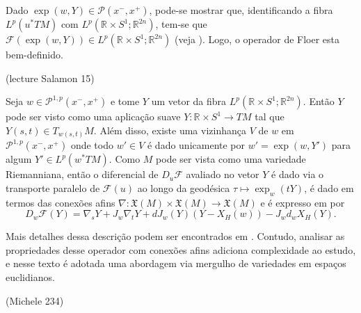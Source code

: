 \documentclass[12pt]{book}
\newcommand{\caminhosexponenciaisconectantesabrev}{\mathcal{P}(x^{-},x^{+})}
\newcommand{\caminhosexponenciaisconectantes}[2]{\mathcal{P}^{1,p}(#1, #2)}
\newcommand{\caminhosexponenciaisconectantespadrao}{\caminhosexponenciaisconectantes{x^{-}}{x^{+}}}
\newcommand{\campossuaves}[1]{\mathfrak{X}(#1)}
\newcommand{\circulo}{S^{1}}
\newcommand{\diferencialfloerponto}[1]{D_{#1}\operadorFloer}
\newcommand{\espacoLp}[1]{L^{p}(#1)}
\newcommand{\espacotangenteponto}[2]{T_{#1}#2}
\newcommand{\operadorFloer}{\mathcal{F}}
\newcommand{\operadorFloerParametro}[1]{\mathcal{F}(#1)}
\newcommand{\pullbackfibradotangente}[2]{#1^{*}T#2}
\newcommand{\pullbackfibradotangenteM}[1]{\pullbackfibradotangente{#1}{M}}
\newcommand{\retacartesianocirculo}{\real{} \times \circulo}
\newcommand{\real}[1]{\mathbb{R}^{#1}}
\newcommand{\aviso}[1]{{\color{violet}(#1)}}
\begin{document}
	Dado $\exp(w,Y) \in \caminhosexponenciaisconectantesabrev$, pode-se mostrar que, identificando a fibra $\espacoLp{\pullbackfibradotangenteM{u}}$ com $\espacoLp{\retacartesianocirculo;\real{2n}}$, tem-se que $\operadorFloerParametro{\exp(w,Y)}\in \espacoLp{\retacartesianocirculo;\real{2n}}$ (veja \cite{audi_floer_homology}). Logo, o operador de Floer esta bem-definido.
	
	\aviso{lecture Salamon 15}
	
	Seja $w \in \caminhosexponenciaisconectantespadrao$ e tome $Y $ um vetor da fibra $ \espacoLp{\retacartesianocirculo;\real{2n}}$. Então $Y$ pode ser visto como uma aplicação suave $Y:\retacartesianocirculo\to TM$ tal que $Y(s,t)\in \espacotangenteponto{w(s,t)}{M}$. Além disso, existe uma vizinhança $V$ de $w$ em $\caminhosexponenciaisconectantespadrao$ onde todo $w' \in V$ é dado unicamente por $w'=\exp(w, Y')$ para algum $Y'\in \espacoLp{\pullbackfibradotangenteM{w}}$. Como $M$ pode ser vista como uma variedade Riemanniana, então o diferencial de $\diferencialfloerponto{u}$ avaliado no vetor $Y$ é dado via o transporte paralelo de $\operadorFloerParametro{u}$ ao longo da geodésica $\tau \mapsto \exp_{w}(tY)$, é dado em termos das conexões afins $\nabla:\campossuaves{M}\times \campossuaves{M} \to \campossuaves{M}$ e é expresso em por
	$$
	\diferencialfloerponto{w}(Y) = \nabla_{s}Y + J_{w}\nabla_{t}Y + dJ_{w}(Y)(Y - X_{H}(w)) - J_{w}d_{w}X_{H}(Y).
	$$
	
	Mais detalhes dessa descrição podem ser encontrados em \cite{salamon_lecture}. Contudo, analisar as propriedades desse operador com conexões afins adiciona complexidade ao estudo, e nesse texto é adotada uma abordagem via mergulho de variedades em espaços euclidianos.
	
	\aviso{Michele 234}
	
\end{document}
